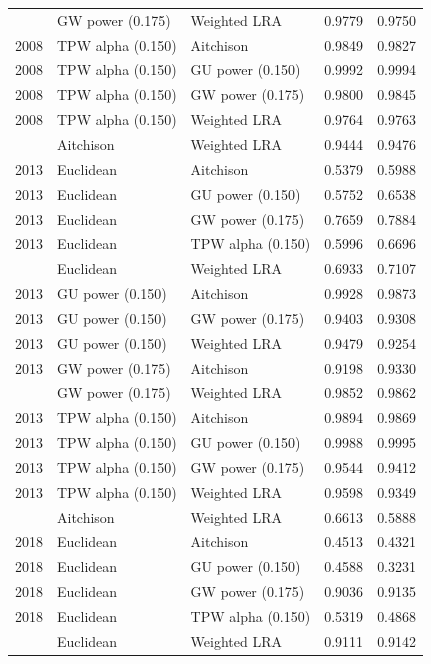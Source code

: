 \begin{longtable}[t]{rllrr}
\addlinespace
2008 & GW power (0.175) & Weighted LRA & 0.9779 & 0.9750\\
2008 & TPW alpha (0.150) & Aitchison & 0.9849 & 0.9827\\
2008 & TPW alpha (0.150) & GU power (0.150) & 0.9992 & 0.9994\\
2008 & TPW alpha (0.150) & GW power (0.175) & 0.9800 & 0.9845\\
2008 & TPW alpha (0.150) & Weighted LRA & 0.9764 & 0.9763\\
\addlinespace
2013 & Aitchison & Weighted LRA & 0.9444 & 0.9476\\
2013 & Euclidean & Aitchison & 0.5379 & 0.5988\\
2013 & Euclidean & GU power (0.150) & 0.5752 & 0.6538\\
2013 & Euclidean & GW power (0.175) & 0.7659 & 0.7884\\
2013 & Euclidean & TPW alpha (0.150) & 0.5996 & 0.6696\\
\addlinespace
2013 & Euclidean & Weighted LRA & 0.6933 & 0.7107\\
2013 & GU power (0.150) & Aitchison & 0.9928 & 0.9873\\
2013 & GU power (0.150) & GW power (0.175) & 0.9403 & 0.9308\\
2013 & GU power (0.150) & Weighted LRA & 0.9479 & 0.9254\\
2013 & GW power (0.175) & Aitchison & 0.9198 & 0.9330\\
\addlinespace
2013 & GW power (0.175) & Weighted LRA & 0.9852 & 0.9862\\
2013 & TPW alpha (0.150) & Aitchison & 0.9894 & 0.9869\\
2013 & TPW alpha (0.150) & GU power (0.150) & 0.9988 & 0.9995\\
2013 & TPW alpha (0.150) & GW power (0.175) & 0.9544 & 0.9412\\
2013 & TPW alpha (0.150) & Weighted LRA & 0.9598 & 0.9349\\
\addlinespace
2018 & Aitchison & Weighted LRA & 0.6613 & 0.5888\\
2018 & Euclidean & Aitchison & 0.4513 & 0.4321\\
2018 & Euclidean & GU power (0.150) & 0.4588 & 0.3231\\
2018 & Euclidean & GW power (0.175) & 0.9036 & 0.9135\\
2018 & Euclidean & TPW alpha (0.150) & 0.5319 & 0.4868\\
\addlinespace
2018 & Euclidean & Weighted LRA & 0.9111 & 0.9142\\

\end{longtable}
